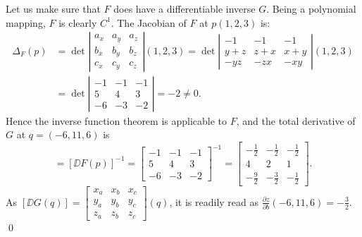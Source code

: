 \documentclass[11pt]{article}
\begin{document}
Let us make sure that $F$ does have a differentiable inverse $G$.
Being a polynomial mapping, $F$ is clearly $C^1$.
The Jacobian of $F$ at $p(1,2,3)$ is:
\begin{align*}
  \Delta_F(p) &= \det \left| \begin{array}{ccc}
    a_x & a_y & a_z \\
    b_x & b_y & b_z \\
    c_x & c_y & c_z
  \end{array} \right| (1,2,3)
  = \det \left| \begin{array}{ccc}
    -1 & -1 & -1 \\
    y+z & z+x & x+y \\
    -yz & -zx & -xy
  \end{array} \right| (1,2,3) \\
  &= \det \left| \begin{array}{ccc}
    -1 & -1 & -1 \\
    5 & 4 & 3 \\
    -6 & -3 & -2
  \end{array} \right| = -2 \neq 0.
\end{align*}
Hence the inverse function theorem is applicable to $F$, and the total derivative of $G$ at $q = (-6, 11, 6)$ is
\begin{equation*}
  [\DD G(q)] = [ \DD F(p) ]^{-1} =
  \begin{bmatrix}
    -1 & -1 & -1 \\
    5 & 4 & 3 \\
    -6 & -3 & -2
  \end{bmatrix}^{-1}
  = \begin{bmatrix}
    -\frac12 & -\frac12 & -\frac12 \\
    4 & 2 & 1 \\
    -\frac92 & -\frac32 & -\frac12
  \end{bmatrix}.
\end{equation*}
As $\displaystyle [\DD G(q)] = \begin{bmatrix}
  x_a & x_b & x_c \\
  y_a & y_b & y_c \\
  z_a & z_b & z_c
\end{bmatrix}(q)$, it is readily read as $\displaystyle \frac{\partial z}{\partial b}(-6,11,6) = -\frac{3}{2}$. \qed
\end{document}

